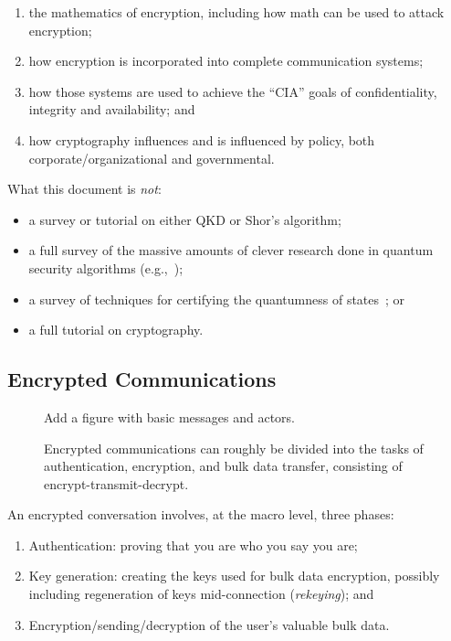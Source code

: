 \begin{enumerate}
\item the mathematics of encryption, including how math can be used to
  attack encryption;
\item how encryption is incorporated into complete communication
  systems;
\item how those systems are used to achieve the ``CIA'' goals of
  confidentiality, integrity and availability; and
\item how cryptography influences and is influenced by policy, both
  corporate/organizational and governmental.
\end{enumerate}

What this document is \emph{not}:

\begin{itemize}
\item a survey or tutorial on either QKD or Shor's algorithm;
\item a full survey of the massive amounts of clever research done in
  quantum security algorithms
  (e.g.,~\cite{PhysRevA.100.052326,buhrman14:_posit_based_quant_crypt,ben-or2005fast,Crepeau:2002:SMQ:509907.510000});
\item a survey of techniques for certifying the quantumness of states~\cite{eisert2019cert}; or
\item a full tutorial on cryptography.
\end{itemize}

\subsection{Encrypted Communications}

\begin{figure}
  {\color{Magenta} Add a figure with basic messages and actors.}
  \caption{Encrypted communications can roughly be divided into the
    tasks of authentication, encryption, and bulk data transfer,
    consisting of encrypt-transmit-decrypt.}
  \label{fig:encrypted-comm}
\end{figure}

An encrypted conversation involves, at the macro level, three phases:

\begin{enumerate}
\item Authentication: proving that you are who you say you are;
\item Key generation: creating the keys used for bulk data encryption,
  possibly including regeneration of keys mid-connection
  (\emph{rekeying}); and
\item Encryption/sending/decryption of the user's valuable bulk data.
\end{enumerate}

